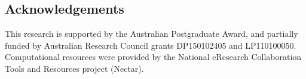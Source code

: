 {\subsection{Acknowledgements}
This research is supported by the Australian Postgraduate
Award, and partially funded by Australian Research Council grants
DP150102405 and LP110100050. Computational resources were provided by the National eResearch Collaboration Tools and Resources project (Nectar).

%


%
}



